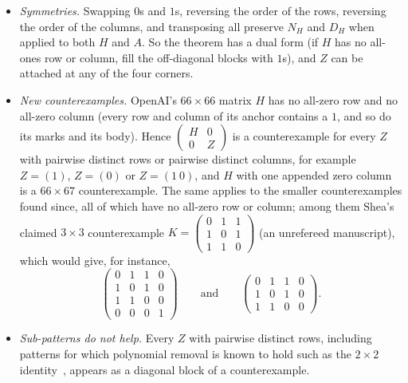 \documentclass{article}
\theoremstyle{plain}
\theoremstyle{definition}
\begin{document}
\begin{itemize}
\item \emph{Symmetries.} Swapping $0$s and $1$s, reversing the order of the rows, reversing the
order of the columns, and transposing all preserve $N_H$ and $D_H$ when applied to both $H$ and
$A$. So the theorem has a dual form (if $H$ has no all-ones row or column, fill the
off-diagonal blocks with $1$s), and $Z$ can be attached at any of the four corners.

\item \emph{New counterexamples.} OpenAI's $66 \times 66$ matrix $H$ has no all-zero row and no
all-zero column (every row and column of its anchor contains a $1$, and so do its marks and its
body). Hence $\begin{pmatrix} H & 0 \\ 0 & Z \end{pmatrix}$ is a counterexample for every $Z$
with pairwise distinct rows or pairwise distinct columns, for example $Z = (1)$, $Z = (0)$ or
$Z = (1\ 0)$, and $H$ with one appended zero column is a $66 \times 67$ counterexample. The same
applies to the smaller counterexamples found since, all of which have no all-zero row or column;
among them Shea's claimed $3 \times 3$ counterexample
$K = \begin{pmatrix} 0&1&1\\1&0&1\\1&1&0 \end{pmatrix}$ (an unrefereed manuscript), which
would give, for instance,
\[
\begin{pmatrix} 0&1&1&0\\1&0&1&0\\1&1&0&0\\0&0&0&1 \end{pmatrix}
\qquad\text{and}\qquad
\begin{pmatrix} 0&1&1&0\\1&0&1&0\\1&1&0&0 \end{pmatrix}.
\]

\item \emph{Sub-patterns do not help.} Every $Z$ with pairwise distinct rows, including patterns
for which polynomial removal is known to hold such as the $2 \times 2$ identity~\cite{Lupini}, appears as a
diagonal block of a counterexample.


\end{itemize}
\end{document}
